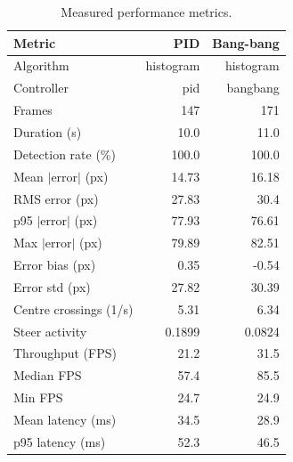 \begin{table}[htbp]
\centering
\caption{Measured performance metrics.}
\label{tab:results}
\begin{tabular}{lrr}
\hline
Metric & PID & Bang-bang \\
\hline
Algorithm & histogram & histogram \\
Controller & pid & bangbang \\
Frames & 147 & 171 \\
Duration (s) & 10.0 & 11.0 \\
Detection rate (\%) & 100.0 & 100.0 \\
Mean $|$error$|$ (px) & 14.73 & 16.18 \\
RMS error (px) & 27.83 & 30.4 \\
p95 $|$error$|$ (px) & 77.93 & 76.61 \\
Max $|$error$|$ (px) & 79.89 & 82.51 \\
Error bias (px) & 0.35 & -0.54 \\
Error std (px) & 27.82 & 30.39 \\
Centre crossings (1/s) & 5.31 & 6.34 \\
Steer activity & 0.1899 & 0.0824 \\
Throughput (FPS) & 21.2 & 31.5 \\
Median FPS & 57.4 & 85.5 \\
Min FPS & 24.7 & 24.9 \\
Mean latency (ms) & 34.5 & 28.9 \\
p95 latency (ms) & 52.3 & 46.5 \\
\hline
\end{tabular}
\end{table}
